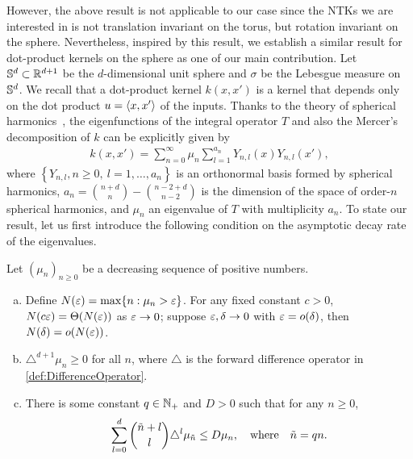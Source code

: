 However, the above result is not applicable to our case since the NTKs we are interested in is not translation invariant on the torus,
but rotation invariant on the sphere.
Nevertheless, inspired by this result, we establish a similar result for dot-product kernels on the sphere as one of our main contribution.
Let $\mathbb{S}^d \subset \mathbb{R}^{d+1}$ be the $d$-dimensional unit sphere and $\sigma$ be the Lebesgue measure on $\mathbb{S}^d$.
We recall that a dot-product kernel $k(x,x')$ is a kernel that depends only on the dot product $u = \left\langle{x,x'}\right\rangle$ of the inputs.
Thanks to the theory of spherical harmonics~\citep{dai2013_ApproximationTheory},
the eigenfunctions of the integral operator $T$ and also the Mercer's decomposition of $k$ can be explicitly given by
\begin{align}
  \label{eq:4_k-SHDecomp}
  k(x,x') = \sum_{n=0}^{\infty} \mu_n \sum_{l=1}^{a_n} Y_{n,l}(x) Y_{n,l}(x'),
\end{align}
where $\left\{ Y_{n,l}, n \geq 0,~ l=1,\dots,a_n\right\}$ is an orthonormal basis formed by spherical harmonics,
$a_n = \binom{n+d}{n} - \binom{n-2+d}{n-2}$ is the dimension of the space of order-$n$ spherical harmonics,
and $\mu_n$ an eigenvalue of $T$ with multiplicity $a_n$.
To state our result, let us first introduce the following condition on the asymptotic decay rate of the eigenvalues.

\begin{condition}
  \label{cond:EDR}
  Let $(\mu_n)_{n \geq 0}$ be a decreasing sequence of positive numbers.
  \begin{enumerate}[(a)]
    \item Define $N(\varepsilon) = \max \{n : \mu_n > \varepsilon\}$.
    For any fixed constant $c > 0$, $N(c \varepsilon) = \Theta(N(\varepsilon))$ as $\varepsilon \to 0$;
    suppose $\varepsilon, \delta \to 0$ with $\varepsilon = o(\delta)$, then $N(\delta) = o(N(\varepsilon))$.
    \item $\triangle^{d+1} \mu_n \geq 0$ for all $n$, where $\triangle$ is the forward difference operator in \cref{def:DifferenceOperator}.
    \item There is some constant $q \in \mathbb{N}_+$ and $D > 0$ such that for any $n \geq 0$,
    \begin{align}
      \label{eq:EDRDerivativeBound}
      \sum_{l=0}^{d} \binom{\tilde{n}+l}{l} \triangle^l \mu_{\tilde{n}} \leq D \mu_n, \qq{where} \tilde{n} = qn.
    \end{align}
  \end{enumerate}
\end{condition}

